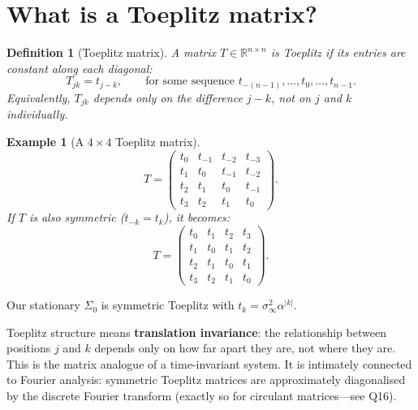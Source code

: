 \documentclass[11pt,a4paper]{article}
\newtheorem{definition}[theorem]{Definition}
\newtheorem{example}[theorem]{Example}
\newcommand{\R}{\mathbb{R}}
\newcommand{\siginf}{\sigma_\infty^2}
\begin{document}
\section{What is a Toeplitz matrix?}
\label{sec:q3}

\begin{definition}[Toeplitz matrix]
A matrix $T \in \R^{n \times n}$ is \emph{Toeplitz} if its entries are constant along each diagonal:
\begin{equation}
  T_{jk} = t_{j-k}, \qquad \text{for some sequence } t_{-(n-1)}, \dots, t_0, \dots, t_{n-1}.
\end{equation}
Equivalently, $T_{jk}$ depends only on the difference $j - k$, not on $j$ and $k$ individually.
\end{definition}

\begin{example}[A $4 \times 4$ Toeplitz matrix]
\begin{equation}
T = \begin{pmatrix}
t_0 & t_{-1} & t_{-2} & t_{-3} \\
t_1 & t_0 & t_{-1} & t_{-2} \\
t_2 & t_1 & t_0 & t_{-1} \\
t_3 & t_2 & t_1 & t_0
\end{pmatrix}.
\end{equation}
If $T$ is also symmetric ($t_{-k} = t_k$), it becomes:
\begin{equation}
T = \begin{pmatrix}
t_0 & t_1 & t_2 & t_3 \\
t_1 & t_0 & t_1 & t_2 \\
t_2 & t_1 & t_0 & t_1 \\
t_3 & t_2 & t_1 & t_0
\end{pmatrix}.
\end{equation}
\end{example}

Our stationary $\Sigma_0$ is symmetric Toeplitz with $t_k = \siginf \alpha^{|k|}$.

\begin{intuitionbox}
Toeplitz structure means \textbf{translation invariance}: the relationship between positions $j$ and $k$ depends only on how far apart they are, not where they are.  This is the matrix analogue of a time-invariant system.  It is intimately connected to Fourier analysis: symmetric Toeplitz matrices are approximately diagonalised by the discrete Fourier transform (exactly so for circulant matrices---see Q16).
\end{intuitionbox}
\end{document}
